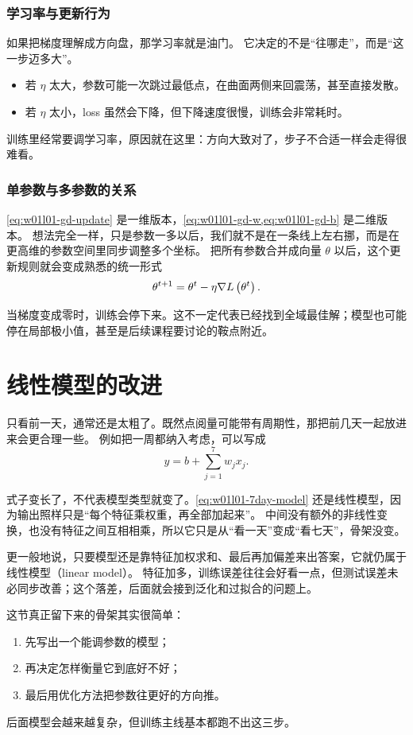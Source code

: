 \documentclass[main.tex]{subfiles}
\begin{document}
\subsubsection{学习率与更新行为}

如果把梯度理解成方向盘，那学习率就是油门。
它决定的不是“往哪走”，而是“这一步迈多大”。
\begin{itemize}
  \item 若 $\eta$ 太大，参数可能一次跳过最低点，在曲面两侧来回震荡，甚至直接发散。
  \item 若 $\eta$ 太小，loss 虽然会下降，但下降速度很慢，训练会非常耗时。
\end{itemize}

训练里经常要调学习率，原因就在这里：方向大致对了，步子不合适一样会走得很难看。

\subsubsection{单参数与多参数的关系}

\cref{eq:w01l01-gd-update} 是一维版本，\cref{eq:w01l01-gd-w,eq:w01l01-gd-b} 是二维版本。
想法完全一样，只是参数一多以后，我们就不是在一条线上左右挪，而是在更高维的参数空间里同步调整多个坐标。
把所有参数合并成向量 $\theta$ 以后，这个更新规则就会变成熟悉的统一形式
\[
  \theta^{t+1} = \theta^t - \eta \nabla L\left( \theta^t \right).
\]

\begin{warningbox}
当梯度变成零时，训练会停下来。这不一定代表已经找到全域最佳解；模型也可能停在局部极小值，甚至是后续课程要讨论的鞍点附近。
\end{warningbox}

\section{线性模型的改进}
\label{sec:w01l01-linear-model}

只看前一天，通常还是太粗了。既然点阅量可能带有周期性，那把前几天一起放进来会更合理一些。
例如把一周都纳入考虑，可以写成
\begin{equation}
  y = b + \sum_{j=1}^{7} w_j x_j.
  \label{eq:w01l01-7day-model}
\end{equation}

式子变长了，不代表模型类型就变了。\cref{eq:w01l01-7day-model} 还是线性模型，因为输出照样只是“每个特征乘权重，再全部加起来”。
中间没有额外的非线性变换，也没有特征之间互相相乘，所以它只是从“看一天”变成“看七天”，骨架没变。

更一般地说，只要模型还是靠特征加权求和、最后再加偏差来出答案，它就仍属于线性模型（linear model）。
特征加多，训练误差往往会好看一点，但测试误差未必同步改善；这个落差，后面就会接到泛化和过拟合的问题上。

\begin{summarybox}
这节真正留下来的骨架其实很简单：
\begin{enumerate}
  \item 先写出一个能调参数的模型；
  \item 再决定怎样衡量它到底好不好；
  \item 最后用优化方法把参数往更好的方向推。
\end{enumerate}
后面模型会越来越复杂，但训练主线基本都跑不出这三步。
\end{summarybox}
\end{document}
